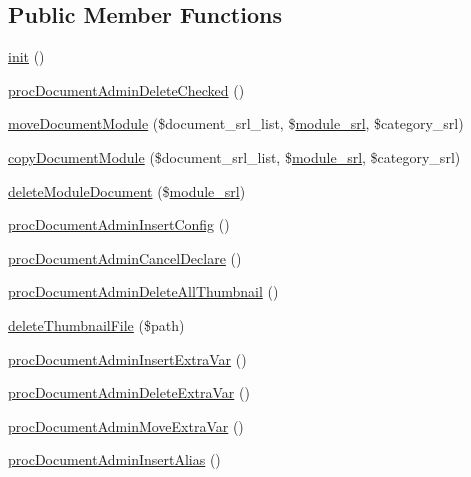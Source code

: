 \subsection*{Public Member Functions}
\begin{DoxyCompactItemize}
\item 
\hyperlink{classdocumentAdminController_a14485f8ce213e059c30b41e6add269f9}{init} ()
\item 
\hyperlink{classdocumentAdminController_a98c455685a7e8e4ab6633a8a66e6f712}{proc\+Document\+Admin\+Delete\+Checked} ()
\item 
\hyperlink{classdocumentAdminController_a2534cbf35966a4ad561b995b7029bc00}{move\+Document\+Module} (\$document\+\_\+srl\+\_\+list, \$\hyperlink{ko_8install_8php_a370bb6450fab1da3e0ed9f484a38b761}{module\+\_\+srl}, \$category\+\_\+srl)
\item 
\hyperlink{classdocumentAdminController_a9133d1466cbf4baae410f180f8b04e34}{copy\+Document\+Module} (\$document\+\_\+srl\+\_\+list, \$\hyperlink{ko_8install_8php_a370bb6450fab1da3e0ed9f484a38b761}{module\+\_\+srl}, \$category\+\_\+srl)
\item 
\hyperlink{classdocumentAdminController_a3b1295649c5dff5b1a63a20aef1afa99}{delete\+Module\+Document} (\$\hyperlink{ko_8install_8php_a370bb6450fab1da3e0ed9f484a38b761}{module\+\_\+srl})
\item 
\hyperlink{classdocumentAdminController_a8b865a9f22d0ca1df7967b4a179f4197}{proc\+Document\+Admin\+Insert\+Config} ()
\item 
\hyperlink{classdocumentAdminController_af6c4d0820de6d6fcbd3d7d2544f97050}{proc\+Document\+Admin\+Cancel\+Declare} ()
\item 
\hyperlink{classdocumentAdminController_a9ff3a9934c8bfa4d2ded4287920c0362}{proc\+Document\+Admin\+Delete\+All\+Thumbnail} ()
\item 
\hyperlink{classdocumentAdminController_a9354a64cd8470838a0cf5705290cb4c5}{delete\+Thumbnail\+File} (\$path)
\item 
\hyperlink{classdocumentAdminController_a8f766283de71f7b22d325eb8dd8b4053}{proc\+Document\+Admin\+Insert\+Extra\+Var} ()
\item 
\hyperlink{classdocumentAdminController_a44eca9af136c50f1d6624a4de83b596a}{proc\+Document\+Admin\+Delete\+Extra\+Var} ()
\item 
\hyperlink{classdocumentAdminController_a037c8e048b5cd6199dd83abbfcb7b92e}{proc\+Document\+Admin\+Move\+Extra\+Var} ()
\item 
\hyperlink{classdocumentAdminController_aa25a9a3e7a5ba0c15b50cc4d324386bc}{proc\+Document\+Admin\+Insert\+Alias} ()

\end{DoxyCompactItemize}
